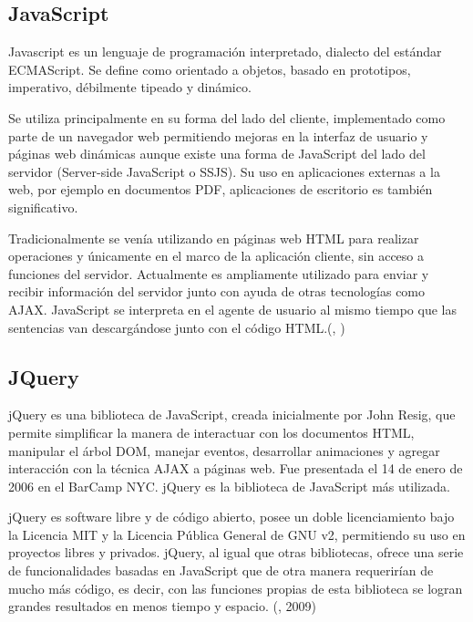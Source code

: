 \subsection{JavaScript}
\setlength{\parskip}{5mm}
Javascript es un lenguaje de programación interpretado, dialecto del estándar ECMAScript. Se define como orientado a objetos, basado en prototipos, imperativo, débilmente tipeado y dinámico.

Se utiliza principalmente en su forma del lado del cliente, implementado como parte de un navegador web permitiendo mejoras en la interfaz de usuario y páginas web dinámicas aunque existe una forma de JavaScript del lado del servidor (Server-side JavaScript o SSJS). Su uso en aplicaciones externas a la web, por ejemplo en documentos PDF, aplicaciones de escritorio es también significativo.

Tradicionalmente se venía utilizando en páginas web HTML para realizar operaciones y únicamente en el marco de la aplicación cliente, sin acceso a funciones del servidor. Actualmente es ampliamente utilizado para enviar y recibir información del servidor junto con ayuda de otras tecnologías como AJAX. JavaScript se interpreta en el agente de usuario al mismo tiempo que las sentencias van descargándose junto con el código HTML.(\citeauthor{javascripbib}, \citeyear{javascripbib})
\setlength{\parskip}{0mm}


\subsection{JQuery}
\setlength{\parskip}{5mm}
jQuery es una biblioteca de JavaScript, creada inicialmente por John Resig, que permite simplificar la manera de interactuar con los documentos HTML, manipular el árbol DOM, manejar eventos, desarrollar animaciones y agregar interacción con la técnica AJAX a páginas web. Fue presentada el 14 de enero de 2006 en el BarCamp NYC. jQuery es la biblioteca de JavaScript más utilizada.

jQuery es software libre y de código abierto, posee un doble licenciamiento bajo la Licencia MIT y la Licencia Pública General de GNU v2, permitiendo su uso en proyectos libres y privados. jQuery, al igual que otras bibliotecas, ofrece una serie de funcionalidades basadas en JavaScript que de otra manera requerirían de mucho más código, es decir, con las funciones propias de esta biblioteca se logran grandes resultados en menos tiempo y espacio.
\setlength{\parskip}{0mm}
(\citet{jquerybib}, 2009)

